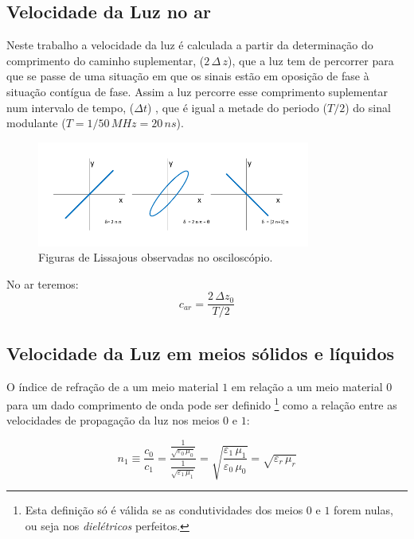 \documentclass[a4paper,12pt]{article}      %
\begin{document}
\subsection{\sf Velocidade da Luz no ar}
Neste trabalho a
velocidade da luz é calculada a partir da determinação do comprimento do
caminho suplementar, ($2\,\Delta\,z$), que a luz tem de percorrer para que se passe de uma
situação em que os sinais estão em oposição de fase à situação contígua de
fase. Assim a luz percorre esse comprimento suplementar num intervalo de
tempo, ($\Delta t$) ,  que é igual a metade do periodo ($T/2$) do sinal modulante ($T=1/50\,MHz= 20\,ns$). 

\begin{figure}
	[htb]  \centering 
	\includegraphics[width=0.8\textwidth]{osci_fase}
	\caption{Figuras de Lissajous observadas no osciloscópio. \label{fig:fase}} 
\end{figure}

No ar teremos:
\begin{equation}
	\label{eq:vc}
	c_{ar} = \frac{2\,\Delta z_0}{T/2} 
\end{equation}

\subsection{\sf Velocidade da Luz em meios sólidos e líquidos}
 O índice de refração de a um meio material $1$ em relação a um meio material $0$
 para um dado comprimento de onda pode ser definido \footnote{Esta definição só é válida se as condutividades dos meios $0$ e $1$ forem nulas, ou seja nos \emph{dielétricos} perfeitos.}
 como a relação entre as velocidades de propagação da luz nos meios $0$ e $1$:

 \begin{equation}
	\label{eq:index}
	n_1 \equiv \frac{c_0}{c_1}  = \frac{\frac{1}{\sqrt{\varepsilon_0 \, \mu_0}} }{\frac{1}{\sqrt{\varepsilon_1 \, \mu_1}} } =
		\sqrt{\frac{\varepsilon_1 \, \mu_1}{\varepsilon_0 \, \mu_0}} = \sqrt{\varepsilon_r \, \mu_r}
\end{equation}
\end{document}
